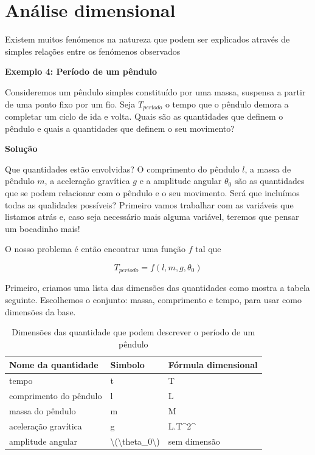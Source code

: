 \documentclass[
  portuguese,
  ]{book}
\begin{document}
\hypertarget{anuxe1lise-dimensional}{%
\section{Análise dimensional}\label{anuxe1lise-dimensional}}

Existem muitos fenómenos na natureza que podem ser explicados através de simples relações entre os fenómenos observados

\textbf{Exemplo 4: Período de um pêndulo}

Consideremos um pêndulo simples constituído por uma massa, suspensa a partir de uma ponto fixo por um fio. Seja \(T_{período}\) o tempo que o pêndulo demora a completar um ciclo de ida e volta. Quais são as quantidades que definem o pêndulo e quais a quantidades que definem o seu movimento?

\textbf{Solução}

Que quantidades estão envolvidas? O comprimento do pêndulo \(l\), a massa de pêndulo \(m\), a aceleração gravítica \(g\) e a amplitude angular \(\theta_0\) são as quantidades que se podem relacionar com o pêndulo e o seu movimento. Será que incluímos todas as qualidades possíveis? Primeiro vamos trabalhar com as variáveis que listamos atrás e, caso seja necessário mais alguma variável, teremos que pensar um bocadinho mais!

O nosso problema é então encontrar uma função \(f\) tal que

\[T_{periodo}=f(l,m,g,\theta_0)\]

Primeiro, criamos uma lista das dimensões das quantidades como mostra a tabela seguinte. Escolhemos o conjunto: massa, comprimento e tempo, para usar como dimensões da base.

\begin{table}

\caption{\label{tab:unnamed-chunk-3}Dimensões das quantidade que podem descrever o período de um pêndulo}
\centering
\begin{tabular}[t]{l|l|l}
\hline
Nome da quantidade & Simbolo & Fórmula dimensional\\
\hline
tempo & t & T\\
\hline
comprimento do pêndulo & l & L\\
\hline
massa do pêndulo & m & M\\
\hline
aceleração gravítica & g & L.T\textasciicircum{}2\textasciicircum{}\\
\hline
amplitude angular & \textbackslash{}(\textbackslash{}theta\_0\textbackslash{}) & sem dimensão\\
\hline
\end{tabular}
\end{table}
\end{document}
